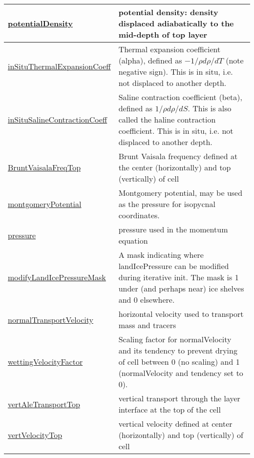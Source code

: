 {\begin{center}
\begin{longtable}{| p{2.0in} | p{4.0in} |}
    \hline
    \hyperref[subsec:var_sec_diagnostics_potentialDensity]{potentialDensity} & potential density: density displaced adiabatically to the mid-depth of top layer \\
    \hline
    \hyperref[subsec:var_sec_diagnostics_inSituThermalExpansionCoeff]{inSituThermalExpansionCoeff} & Thermal expansion coefficient (alpha), defined as $-1/\rho d\rho/dT$ (note negative sign).  This is in situ, i.e. not displaced to another depth. \\
    \hline
    \hyperref[subsec:var_sec_diagnostics_inSituSalineContractionCoeff]{inSituSalineContractionCoeff} & Saline contraction coefficient (beta), defined as $1/\rho d\rho/dS$.  This is also called the haline contraction coefficient.  This is in situ, i.e. not displaced to another depth. \\
    \hline
    \hyperref[subsec:var_sec_diagnostics_BruntVaisalaFreqTop]{BruntVaisalaFreqTop} & Brunt Vaisala frequency defined at the center (horizontally) and top (vertically) of cell \\
    \hline
    \hyperref[subsec:var_sec_diagnostics_montgomeryPotential]{montgomeryPotential} & Montgomery potential, may be used as the pressure for isopycnal coordinates. \\
    \hline
    \hyperref[subsec:var_sec_diagnostics_pressure]{pressure} & pressure used in the momentum equation \\
    \hline
    \hyperref[subsec:var_sec_diagnostics_modifyLandIcePressureMask]{modifyLandIcePressureMask} & A mask indicating where landIcePressure can be modified during iterative init.  The mask is 1 under (and perhaps near) ice shelves and 0 elsewhere. \\
    \hline
    \hyperref[subsec:var_sec_diagnostics_normalTransportVelocity]{normalTransportVelocity} & horizontal velocity used to transport mass and tracers \\
    \hline
    \hyperref[subsec:var_sec_diagnostics_wettingVelocityFactor]{wettingVelocityFactor} & Scaling factor for normalVelocity and its tendency to prevent drying of cell between 0 (no scaling) and 1 (normalVelocity and tendency set to 0). \\
    \hline
    \hyperref[subsec:var_sec_diagnostics_vertAleTransportTop]{vertAleTransportTop} & vertical transport through the layer interface at the top of the cell \\
    \hline
    \hyperref[subsec:var_sec_diagnostics_vertVelocityTop]{vertVelocityTop} & vertical velocity defined at center (horizontally) and top (vertically) of cell \\

\end{longtable}
\end{center}}
